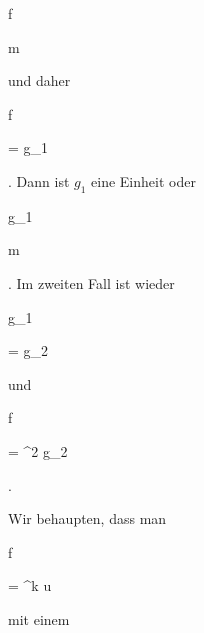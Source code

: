 {{\vergleichskette

{f
}

{ \in }{ {\mathfrak m}
}

{  }{
}

{    }{
}

{   }{
}

}
{}{}{}
und daher


\mavergleichskette

{\vergleichskette

{f
}

{ = }{ \pi g_1
}

{  }{
}

{    }{
}

{   }{
}

}
{}{}{.}
Dann ist $g_1$ eine Einheit oder


\mavergleichskette

{\vergleichskette

{g_1
}

{ \in }{ {\mathfrak m}
}

{  }{
}

{    }{
}

{   }{
}

}
{}{}{.}
Im zweiten Fall ist wieder


\mavergleichskette

{\vergleichskette

{g_1
}

{ = }{ \pi g_2
}

{  }{
}

{    }{
}

{   }{
}

}
{}{}{}
und


\mavergleichskette

{\vergleichskette

{ f
}

{ = }{ \pi^2 g_2
}

{  }{
}

{    }{
}

{   }{
}

}
{}{}{.}


Wir behaupten, dass man


\mavergleichskette

{\vergleichskette

{f
}

{ = }{ \pi^k u
}

{  }{
}

{    }{
}

{   }{
}

}
{}{}{}
mit einem


}
